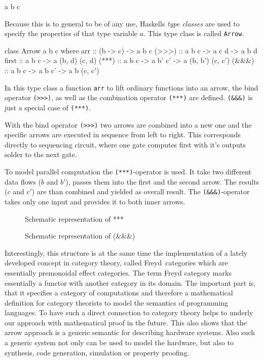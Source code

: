 \documentclass[9pt,final,a4paper,leqno]{article}
\newcommand{\xfig}[4][0.9] {%
    \begin{figure}[ht]
        \begin{center}
            \graphicspath{{./}{Images/}}
            \scalebox{#1}{%
                
            }
            \caption{\label{#4} #3}
        \end{center}
    \end{figure}
}
\newcommand{\hs}[1]{\mbox{\lstinline[basicstyle=\color{textgray}]!#1!}}
\begin{document}
\begin{center}
\begin{minipage}{.2\textwidth}
\begin{haskell}
a b c
\end{haskell}
\end{minipage} \end{center}

Because this is to general to be of any use, Haskells \emph{type classes} are used to specify the properties of that type variable $a$. This
type class is called \hs{Arrow}. 

\begin{haskell}
class Arrow a b c where 
  arr   :: (b -> c) -> a b c
  (>>>)  :: a b c    -> a c d   -> a b d
  first :: a b c    -> a (b, d) (c, d) 
  (***) :: a b c    -> a b' c' -> a (b, b') (c, c')
  (&&&) :: a b c    -> a b  c' -> a  b      (c, c')
\end{haskell}

In this type class a function \hs{arr} to lift ordinary functions into an arrow, the bind operator \hs{(>>>)}, as well as the combination
operator \hs{(***)} are defined. \hs{(&&&)} is just a special case of \hs{(***)}. 

\par
With the bind operator \hs{(>>>)} two arrows are combined into a new one and the specific arrows are executed in sequence from left to
right. This corresponds directly to sequencing circuit, where one gate computes first with it's outputs solder to the next gate. 
\par 
To model parallel computation the \hs{(***)}-operator is used. It take two different data flows ($b$ and $b'$), passes them into the first
and the second arrow. The results ($c$ and $c'$) are than combined and yielded as overall result. The \hs{(&&&)}-operator takes only one
input and provides it to both inner arrows.

\xfig[.6]{ArrowStarStarStar}{Schematic representation of ***}{figure:ststst}
\xfig[.6]{ArrowAndAndAnd}{Schematic representation of (\&\&\&)}{figure:ananan}

\par
Interestingly, this structure is at the same time the implementation of a lately developed concept in category theory, called Freyd~categories 
which are essentially premonoidal effect categories\cite{Heunen06arrows, Hughes98generalisingmonads,PatersonRA}. The term Freyd
category marks essentially a functor with another category in its domain. The important part is, that it specifies a category of
computations and therefore a mathematical definition for category theorists to model the semantics of programming languages. To have such a
direct connection to category theory helps to underly our approach with mathematical proof in the future. This also shows that the arrow
approach is a generic semantic for describing hardware systems. Also such a generic system not only can be used to model the hardware, but
also to synthesis, code generation, simulation or property proofing. 
\end{document}
